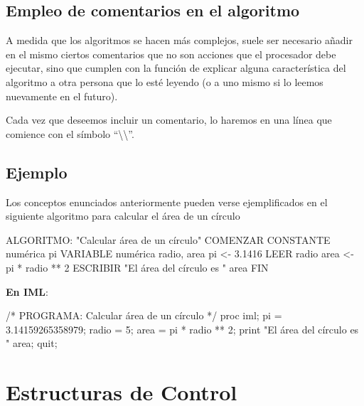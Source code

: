 \documentclass[
]{book}
\newenvironment{Shaded}{\begin{snugshade}}{\end{snugshade}}
\newcommand{\NormalTok}[1]{#1}
\begin{document}
\hypertarget{empleo-de-comentarios-en-el-algoritmo}{%
\section{Empleo de comentarios en el algoritmo}\label{empleo-de-comentarios-en-el-algoritmo}}

A medida que los algoritmos se hacen más complejos, suele ser necesario añadir en el mismo ciertos comentarios que no son acciones que el procesador debe ejecutar, sino que cumplen con la función de explicar alguna característica del algoritmo a otra persona que lo esté leyendo (o a uno mismo si lo leemos nuevamente en el futuro).

Cada vez que deseemos incluir un comentario, lo haremos en una línea que comience con el símbolo ``\textbackslash\textbackslash{}''.

\hypertarget{ejemplo}{%
\section{Ejemplo}\label{ejemplo}}

Los conceptos enunciados anteriormente pueden verse ejemplificados en el siguiente algoritmo para calcular el área de un círculo

\begin{Shaded}
\begin{Highlighting}[]
\NormalTok{ALGORITMO: "Calcular área de un círculo"}
\NormalTok{COMENZAR}
\NormalTok{    CONSTANTE numérica pi}
\NormalTok{    VARIABLE numérica radio, area}
\NormalTok{    pi \textless{}{-} 3.1416}
\NormalTok{    LEER radio}
\NormalTok{    area \textless{}{-} pi * radio ** 2}
\NormalTok{    ESCRIBIR "El área del círculo es " area}
\NormalTok{FIN}
\end{Highlighting}
\end{Shaded}

\textbf{En IML}:

\begin{Shaded}
\begin{Highlighting}[]
\NormalTok{/* PROGRAMA: Calcular área de un círculo */}
\NormalTok{proc iml;}
\NormalTok{    pi = 3.14159265358979;}
\NormalTok{    radio = 5;}
\NormalTok{    area = pi * radio ** 2;}
\NormalTok{    print "El área del círculo es " area;}
\NormalTok{quit;}
\end{Highlighting}
\end{Shaded}

\hypertarget{estructuras-de-control}{%
\chapter{Estructuras de Control}\label{estructuras-de-control}}
\end{document}
